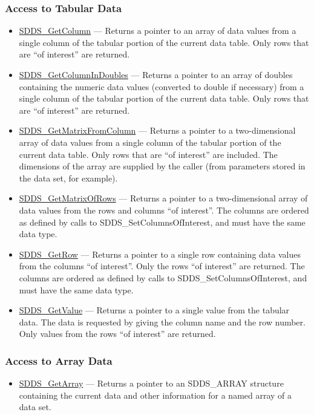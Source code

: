 \documentclass[11pt]{article}
\newcommand{\progref}[1]{\hyperref{SDDS_#1}{{\tt SDDS\_#1} (}{)}{SDDS_#1}}
\begin{document}
\subsubsection{Access to Tabular Data}

\begin{itemize}
\item \progref{GetColumn} --- Returns a pointer to an array of data values from a single column of the tabular portion of the current data table. Only rows that are ``of interest'' are returned.
\item \progref{GetColumnInDoubles} --- Returns a pointer to an array of doubles containing the numeric data values (converted to double if necessary) from a single column of the tabular portion of the current data table. Only rows that are ``of interest'' are returned.
\item \progref{GetMatrixFromColumn} --- Returns a pointer to a two-dimensional array of data values from a single column of the tabular portion of the current data table. Only rows that are ``of interest'' are included. The dimensions of the array are supplied by the caller (from parameters stored in the data set, for example).
\item \progref{GetMatrixOfRows} --- Returns a pointer to a two-dimensional array of data values from the rows and columns ``of interest''. The columns are ordered as defined by calls to SDDS\_SetColumnsOfInterest, and must have the same data type.
\item \progref{GetRow} --- Returns a pointer to a single row containing data values from the columns ``of interest''. Only the rows ``of interest'' are returned. The columns are ordered as defined by calls to SDDS\_SetColumnsOfInterest, and must have the same data type.
\item \progref{GetValue} --- Returns a pointer to a single value from the tabular data. The data is requested by giving the column name and the row number. Only values from the rows ``of interest'' are returned. 
\end{itemize}

\subsubsection{Access to Array Data}

\begin{itemize}
\item \progref{GetArray} --- Returns a pointer to an SDDS\_ARRAY structure containing the current data and other information for a named array of a data set. 
\end{itemize}
\end{document}
